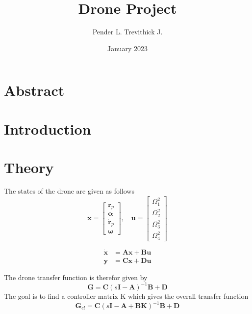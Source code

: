 \documentclass{article}
\begin{document}
\title{Drone Project}
\author{Pender L. Trevithick J.}
\date{January 2023}
\maketitle

\section{Abstract}

\section{Introduction}

\section{Theory}

The states of the drone are given as follows
\begin{equation}
    \mathbf{x} = \begin{bmatrix} \mathbf{r}_p \\ \boldsymbol{\alpha} \\ \mathbf{\dot{r}}_p \\  \boldsymbol{\omega}  \end{bmatrix}, \quad \mathbf{u} = \begin{bmatrix} \Omega_1^2 \\ \Omega_2^2 \\ \Omega_3^2 \\ \Omega_4^2 \end{bmatrix}
\end{equation}

\begin{align}
    \mathbf{\dot{x}} &= \mathbf{Ax} + \mathbf{Bu} \\
    \mathbf{y} &= \mathbf{Cx} + \mathbf{Du}
\end{align}

The drone transfer function is therefor given by
\begin{equation}
    \mathbf{G} = \mathbf{C} (s\mathbf{I} - \mathbf{A})^{-1} \mathbf{B} + \mathbf{D}
\end{equation}
The goal is to find a controller matrix K which gives the overall transfer function
\begin{equation}
    \mathbf{G}_{cl} = \mathbf{C} (s\mathbf{I} - \mathbf{A} + \mathbf{BK})^{-1} \mathbf{B} + \mathbf{D}
\end{equation}
\end{document}
